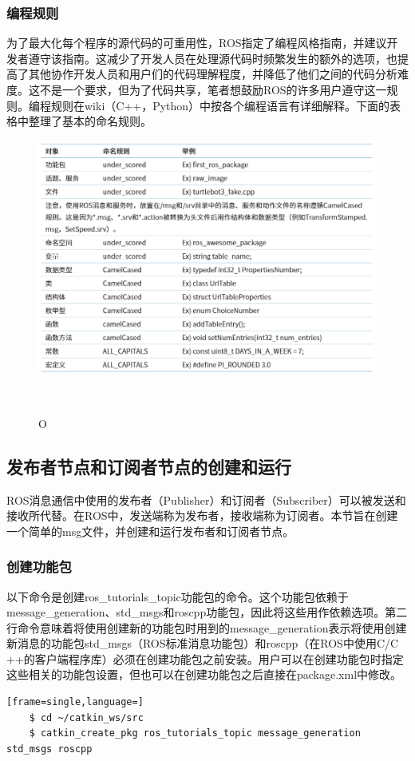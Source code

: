\documentclass[geye,green,kindle,cn]{elegantnote}
\begin{document}
\subsubsection{编程规则}
为了最大化每个程序的源代码的可重用性，ROS指定了编程风格指南，并建议开发者遵守该指南。这减少了开发人员在处理源代码时频繁发生的额外的选项，也提高了其他协作开发人员和用户们的代码理解程度，并降低了他们之间的代码分析难度。这不是一个要求，但为了代码共享，笔者想鼓励ROS的许多用户遵守这一规则。编程规则在wiki（C++，Python）中按各个编程语言有详细解释。下面的表格中整理了基本的命名规则。
\begin{figure}[htbp]
\centering
\includegraphics[width=1\linewidth]{src/O.png}
\centering
\caption{O} \label{picture:O}
\end{figure}

\subsection{发布者节点和订阅者节点的创建和运行}
ROS消息通信中使用的发布者（Publisher）和订阅者（Subscriber）可以被发送和接收所代替。在ROS中，发送端称为发布者，接收端称为订阅者。本节旨在创建一个简单的msg文件，并创建和运行发布者和订阅者节点。 
\subsubsection{创建功能包}
以下命令是创建ros\_tutorials\_topic功能包的命令。这个功能包依赖于message\_generation、std\_msgs和roscpp功能包，因此将这些用作依赖选项。第二行命令意味着将使用创建新的功能包时用到的message\_generation表示将使用创建新消息的功能包std\_msgs（ROS标准消息功能包）和roscpp（在ROS中使用C/C ++的客户端程序库）必须在创建功能包之前安装。用户可以在创建功能包时指定这些相关的功能包设置，但也可以在创建功能包之后直接在package.xml中修改。
\begin{lstlisting}[frame=single,language=]
    $ cd ~/catkin_ws/src 
    $ catkin_create_pkg ros_tutorials_topic message_generation std_msgs roscpp 
\end{lstlisting}
\end{document}
